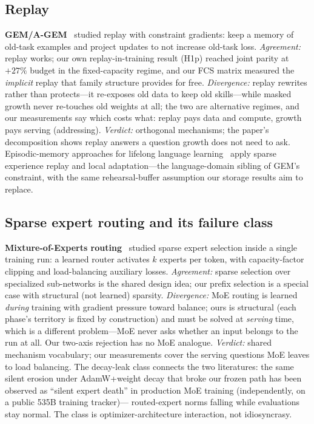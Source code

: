 \documentclass[11pt]{article}
\theoremstyle{definition}\newtheorem{definition}{Definition}
\theoremstyle{remark}\newtheorem{remark}{Remark}
\begin{document}
\subsection{Replay}
\label{sec:prior:replay}

\textbf{GEM/A-GEM}~\cite{gem,agem} studied replay with constraint gradients: keep a
memory of old-task examples and project updates to not increase old-task loss.
\emph{Agreement:} replay works; our own replay-in-training result (H1p) reached joint
parity at $+27\%$ budget in the fixed-capacity regime, and our FCS matrix measured the
\emph{implicit} replay that family structure provides for free. \emph{Divergence:} replay
rewrites rather than protects---it re-exposes old data to keep old skills---while masked
growth never re-touches old weights at all; the two are alternative regimes, and our
measurements say which costs what: replay pays data and compute, growth pays serving
(addressing). \emph{Verdict:} orthogonal mechanisms; the paper's decomposition shows
replay answers a question growth does not need to ask. Episodic-memory approaches for lifelong language learning~\cite{multilingual-cl} apply sparse experience replay and local adaptation---the language-domain sibling of GEM's constraint, with the same rehearsal-buffer assumption our storage results aim to replace.

\subsection{Sparse expert routing and its failure class}
\label{sec:prior:moe}

\textbf{Mixture-of-Experts routing}~\cite{shazeer,switch,gshard} studied sparse expert
selection inside a single training run: a learned router activates $k$ experts per token,
with capacity-factor clipping and load-balancing auxiliary losses. \emph{Agreement:}
sparse selection over specialized sub-networks is the shared design idea; our prefix
selection is a special case with structural (not learned) sparsity. \emph{Divergence:}
MoE routing is learned \emph{during} training with gradient pressure toward balance; ours
is structural (each phase's territory is fixed by construction) and must be solved at
\emph{serving} time, which is a different problem---MoE never asks whether an input belongs
to the run at all. Our two-axis rejection has no MoE analogue. \emph{Verdict:} shared
mechanism vocabulary; our measurements cover the serving questions MoE leaves to load
balancing. The decay-leak class connects the two literatures: the same silent erosion
under AdamW+weight decay that broke our frozen path has been observed as ``silent expert
death'' in production MoE training (independently, on a public 535B training tracker)---
routed-expert norms falling while evaluations stay normal. The class is
optimizer-architecture interaction, not idiosyncrasy.
\end{document}
